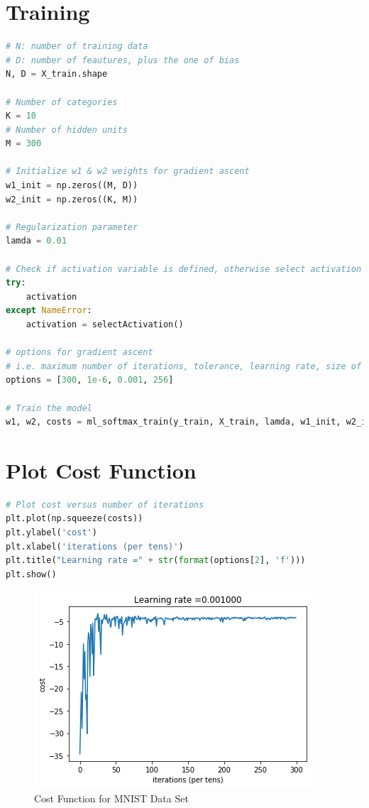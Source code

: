 \documentclass[11pt]{article}
\begin{document}
\newpage

\section{Training}

\begin{lstlisting}[language = Python]
# N: number of training data
# D: number of feautures, plus the one of bias
N, D = X_train.shape

# Number of categories
K = 10
# Number of hidden units
M = 300 

# Initialize w1 & w2 weights for gradient ascent
w1_init = np.zeros((M, D))
w2_init = np.zeros((K, M))

# Regularization parameter
lamda = 0.01

# Check if activation variable is defined, otherwise select activation function
try:
    activation
except NameError:
    activation = selectActivation()

# options for gradient ascent
# i.e. maximum number of iterations, tolerance, learning rate, size of batches
options = [300, 1e-6, 0.001, 256]

# Train the model
w1, w2, costs = ml_softmax_train(y_train, X_train, lamda, w1_init, w2_init, options, activation)
\end{lstlisting}

\newpage

\section{Plot Cost Function}

\begin{lstlisting}[language = Python]
# Plot cost versus number of iterations
plt.plot(np.squeeze(costs))
plt.ylabel('cost')
plt.xlabel('iterations (per tens)')
plt.title("Learning rate =" + str(format(options[2], 'f')))
plt.show()
\end{lstlisting}

\begin{figure}[h]
  \includegraphics[width=\linewidth]{./Project_1_files/Project_1_60_0.png}
  \caption{Cost Function for MNIST Data Set}
  \label{fig:cost}
\end{figure}
\end{document}
